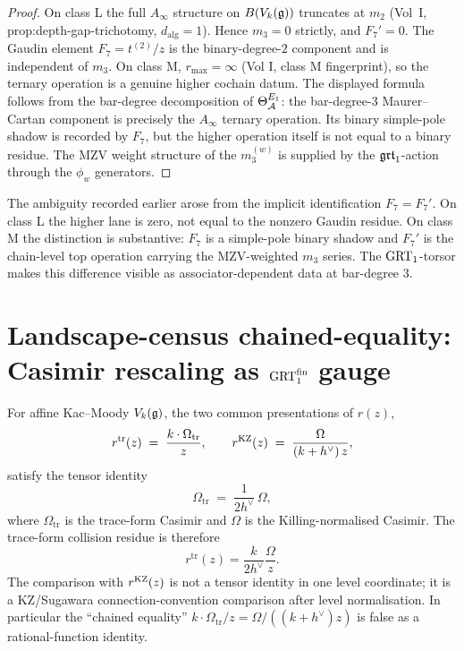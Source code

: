 \begin{proof}
On class L the full $A_\infty$ structure on $B(V_k(\mathfrak{g}))$ truncates
at $m_2$ (Vol~I, prop:depth-gap-trichotomy, $d_{\mathrm{alg}}=1$).
Hence $m_3 = 0$ strictly, and $F_7' = 0$. The Gaudin element
$F_7 = t^{(2)}/z$ is the binary-degree-$2$ component and is
independent of $m_3$. On class M, $r_{\max} = \infty$ (Vol I,
class M fingerprint), so the ternary operation is a genuine higher
cochain datum. The displayed formula follows from the bar-degree
decomposition of $\Theta_{\mathcal{A}}^{E_1}$: the bar-degree-$3$
Maurer--Cartan component is precisely the $A_\infty$ ternary
operation. Its binary simple-pole shadow is recorded by $F_7$, but
the higher operation itself is not equal to a binary residue. The MZV weight
structure of the $m_3^{(w)}$ is supplied by the $\mathfrak{grt}_1$-action
through the $\phi_w$ generators.
\end{proof}

\begin{remark}
The ambiguity recorded earlier arose from the implicit
identification $F_7 = F_7'$. On class L the higher lane is zero, not
equal to the nonzero Gaudin residue. On class M the distinction is
substantive: $F_7$ is a simple-pole binary shadow and $F_7'$ is the
chain-level top operation carrying the MZV-weighted $m_3$ series. The
$\mathrm{GRT}_1$-torsor makes this difference visible as associator-dependent
data at bar-degree $3$.
\end{remark}

\section{Landscape-census chained-equality: Casimir rescaling
as \texorpdfstring{$\mathrm{GRT}_1^{\mathrm{fin}}$}{GRT-fin} gauge}
\label{sec:grtfin}

\begin{proposition}
For affine Kac--Moody $V_k(\mathfrak{g})$, the two common presentations of
$r(z)$,
\[
 r^{\mathrm{tr}}(z) \;=\; \frac{k\cdot\Omega_{\mathrm{tr}}}{z},
 \qquad
 r^{\mathrm{KZ}}(z) \;=\; \frac{\Omega}{(k+h^\vee)\,z},
\]
satisfy the tensor identity
\[
 \Omega_{\mathrm{tr}} \;=\; \frac{1}{2h^\vee}\,\Omega,
\]
where $\Omega_{\mathrm{tr}}$ is the trace-form Casimir and $\Omega$
is the Killing-normalised Casimir. The trace-form collision residue is
therefore
\[
 r^{\mathrm{tr}}(z)=\frac{k}{2h^\vee}\frac{\Omega}{z}.
\]
The comparison with $r^{\mathrm{KZ}}(z)$ is not a tensor identity in one level
coordinate; it is a KZ/Sugawara connection-convention comparison after
level normalisation. In particular the ``chained equality''
$k\cdot\Omega_{\mathrm{tr}}/z = \Omega/((k+h^\vee)z)$ is false as a
rational-function identity.
\end{proposition}

